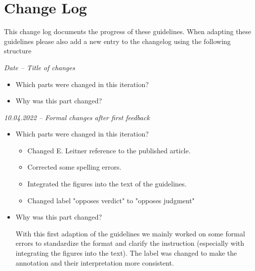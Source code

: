 \documentclass{article}
\begin{document}
\section{Change Log}
This change log documents the progress of these guidelines. When adapting these guidelines please also add a new entry to the changelog using the following structure
\begin{mdframed}[frametitle={Template}]
\emph{Date – Title of changes}
\begin{itemize}
	\item Which parts were changed in this iteration?
    \item Why was this part changed?
\end{itemize}
\end{mdframed}
\begin{mdframed}[frametitle={}]
\emph{10.04.2022 – Formal changes after first feedback}
\begin{itemize}
	\item Which parts were changed in this iteration? 
	\begin{itemize}
	    \item Changed E. Leitner reference to the published article.
	    \item Corrected some spelling errors.
	    \item Integrated the figures into the text of the guidelines.
	    \item Changed label "opposes verdict" to "opposes judgment"
	\end{itemize} 
    \item Why was this part changed?
    
    With this first adaption of the guidelines we mainly worked on some formal errors to standardize the format and clarify the instruction (especially with integrating the figures into the text). The label was changed to make the annotation and their interpretation more consistent.

\end{itemize}
\end{mdframed}
\end{document}
